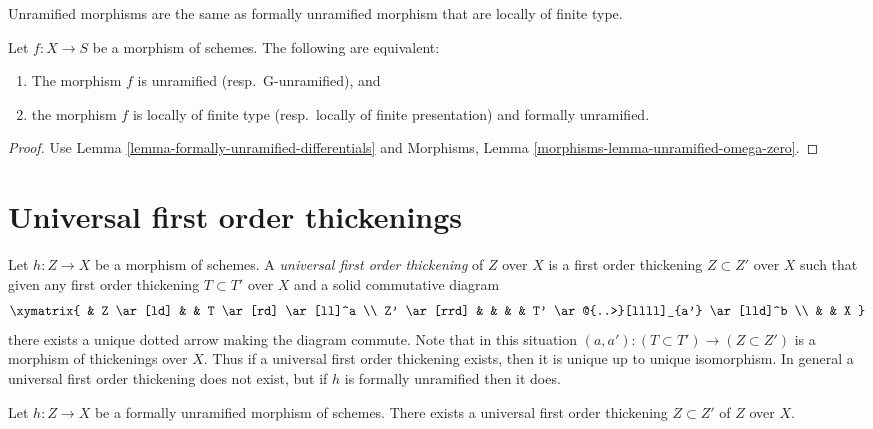 \begin{lemma}
\label{lemma-unramified-formally-unramified}
\begin{slogan}
Unramified morphisms are the same as formally unramified morphism that
are locally of finite type.
\end{slogan}
Let $f : X \to S$ be a morphism of schemes.
The following are equivalent:
\begin{enumerate}
\item The morphism $f$ is unramified (resp.\ G-unramified), and
\item the morphism $f$ is locally of finite type (resp.\ locally of finite
presentation) and formally unramified.
\end{enumerate}
\end{lemma}

\begin{proof}
Use Lemma \ref{lemma-formally-unramified-differentials} and
Morphisms, Lemma \ref{morphisms-lemma-unramified-omega-zero}.
\end{proof}









\section{Universal first order thickenings}
\label{section-universal-thickening}

\noindent
Let $h : Z \to X$ be a morphism of schemes. A {\it universal first order
thickening} of $Z$ over $X$ is a first order thickening $Z \subset Z'$
over $X$ such that given any first order thickening $T \subset T'$
over $X$ and a solid commutative diagram
$$
\xymatrix{
& Z \ar[ld] & & T \ar[rd] \ar[ll]^a \\
Z' \ar[rrd] & & & & T' \ar@{..>}[llll]_{a'} \ar[lld]^b \\
 & & X
}
$$
there exists a unique dotted arrow making the diagram commute.
Note that in this situation $(a, a') : (T \subset T') \to (Z \subset Z')$
is a morphism of thickenings over $X$. Thus if a universal first order
thickening exists, then it is unique up to unique isomorphism.
In general a universal first order thickening
does not exist, but if $h$ is formally unramified then it does.

\begin{lemma}
\label{lemma-universal-thickening}
Let $h : Z \to X$ be a formally unramified morphism of schemes.
There exists a universal first order thickening $Z \subset Z'$ of
$Z$ over $X$.
\end{lemma}

